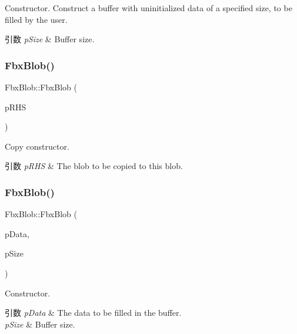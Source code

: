 Constructor. Construct a buffer with uninitialized data of a specified size, to be filled by the user. 
\begin{DoxyParams}{引数}
{\em p\+Size} & Buffer size. \\
\hline
\end{DoxyParams}
\mbox{\label{class_fbx_blob_a2636c1976b481f86ee4393c0d50b0470}} 
\subsubsection{\texorpdfstring{Fbx\+Blob()}{FbxBlob()}\hspace{0.1cm}{\footnotesize\ttfamily [3/4]}}
{\footnotesize\ttfamily Fbx\+Blob\+::\+Fbx\+Blob (\begin{DoxyParamCaption}\item[{const \hyperlink{class_fbx_blob}{Fbx\+Blob} \&}]{p\+R\+HS }\end{DoxyParamCaption})}

Copy constructor. 
\begin{DoxyParams}{引数}
{\em p\+R\+HS} & The blob to be copied to this blob. \\
\hline
\end{DoxyParams}
\mbox{\label{class_fbx_blob_a2359aefdd7854a89d3d4bff0980696c1}} 
\subsubsection{\texorpdfstring{Fbx\+Blob()}{FbxBlob()}\hspace{0.1cm}{\footnotesize\ttfamily [4/4]}}
{\footnotesize\ttfamily Fbx\+Blob\+::\+Fbx\+Blob (\begin{DoxyParamCaption}\item[{const void $\ast$}]{p\+Data,  }\item[{int}]{p\+Size }\end{DoxyParamCaption})}

Constructor. 
\begin{DoxyParams}{引数}
{\em p\+Data} & The data to be filled in the buffer. \\
\hline
{\em p\+Size} & Buffer size. \\
\hline
\end{DoxyParams}
\mbox{\label{class_fbx_blob_ab0e197c8fc8bd7ff64d1d95501984132}} 
